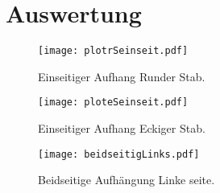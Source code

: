 \section{Auswertung}
\label{sec:Auswertung}

\begin{figure}
  \centering
  \texttt{[image: plotrSeinseit.pdf]}
  \caption{Einseitiger Aufhang Runder Stab.}
  \label{fig:plotrSeinseit}
\end{figure}

\begin{figure}
  \centering
  \texttt{[image: ploteSeinseit.pdf]}
  \caption{Einseitiger Aufhang Eckiger Stab.}
  \label{fig:ploteSeinseit}
\end{figure}

\begin{figure}
  \centering
  \texttt{[image: beidseitigLinks.pdf]}
  \caption{Beidseitige Aufhängung Linke seite.}
  \label{fig:beidseitigLinks}
\end{figure}





